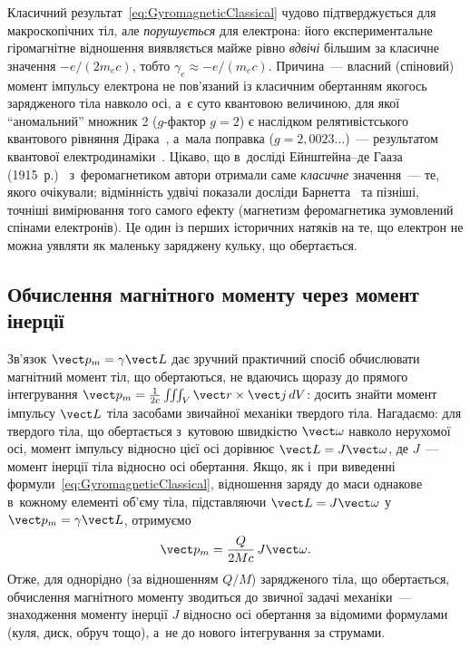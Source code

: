 \begin{Historical}[unbreakable]
	Класичний результат~\eqref{eq:GyromagneticClassical} чудово підтверджується для
	макроскопічних тіл, але \emph{порушується} для електрона: його експериментальне
	гіромагнітне відношення виявляється майже рівно \emph{вдвічі} більшим за класичне
	значення $-e/(2m_ec)$, тобто $\gamma_e \approx -e/(m_ec)$. Причина~--- власний
	(спіновий) момент імпульсу електрона не пов'язаний із класичним обертанням якогось
	зарядженого тіла навколо осі, а~є суто квантовою величиною, для якої
	\enquote{аномальний} множник 2 ($g$-фактор $g=2$) є наслідком релятивістського
	квантового рівняння Дірака~\cite{Dirac1928}, а~мала поправка ($g = 2{,}0023\ldots$)~--- результатом
	квантової електродинаміки~\cite{Schwinger1948}. Цікаво, що в~досліді Ейнштейна--де Гааза (1915~р.)~\cite{EinsteinDeHaas1915}
	з~феромагнетиком автори отримали саме \emph{класичне} значення~--- те, якого очікували;
	відмінність удвічі показали досліди Барнетта~\cite{Barnett1915} та пізніші, точніші вимірювання того самого
	ефекту (магнетизм феромагнетика зумовлений спінами електронів).
	Це один із перших історичних натяків на те, що електрон не можна уявляти як маленьку
	заряджену кульку, що обертається.
\end{Historical}


\subsection*{Обчислення магнітного моменту через момент інерції}


Зв'язок $\vect p_m = \gamma\vect L$ дає зручний практичний спосіб обчислювати магнітний
момент тіл, що обертаються, не вдаючись щоразу до прямого інтегрування $\vect p_m =
	\frac1{2c}\iiint_V \vect r\times\vect j\, dV$: досить знайти момент імпульсу $\vect L$
тіла засобами звичайної механіки твердого тіла. Нагадаємо: для твердого тіла, що
обертається з~кутовою швидкістю $\vect\omega$ навколо нерухомої осі, момент імпульсу
відносно цієї осі дорівнює $\vect L = J\vect\omega$, де $J$~--- момент інерції тіла
відносно осі обертання. Якщо, як і~при виведенні формули~\eqref{eq:GyromagneticClassical},
відношення заряду до маси однакове в~кожному елементі об'єму тіла, підставляючи $\vect
	L=J\vect\omega$ у~$\vect p_m=\gamma\vect L$, отримуємо
\begin{equation}\label{eq:MagMomentViaInertia}
	\vect p_m = \frac{Q}{2Mc}\, J\vect\omega.
\end{equation}
Отже, для однорідно (за відношенням $Q/M$) зарядженого тіла, що обертається, обчислення
магнітного моменту зводиться до звичної задачі механіки~--- знаходження моменту інерції
$J$ відносно осі обертання за відомими формулами (куля, диск, обруч тощо), а~не до нового
інтегрування за струмами.

